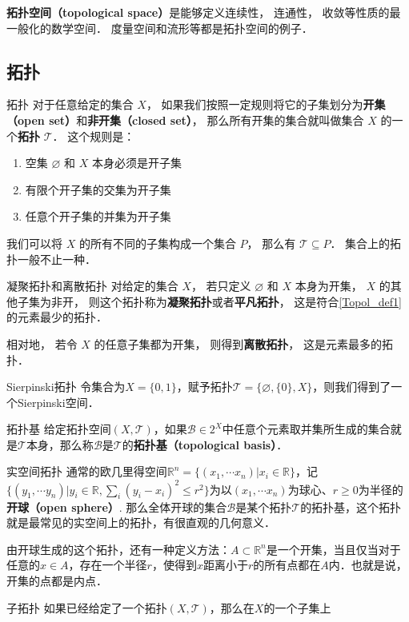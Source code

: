 

\textbf{拓扑空间（topological space）}是能够定义连续性， 连通性， 收敛等性质的最一般化的数学空间． 度量空间和流形等都是拓扑空间的例子．

\subsection{拓扑}

\begin{definition}{拓扑}\label{Topol_def1}
对于任意给定的集合 $X$， 如果我们按照一定规则将它的子集划分为\textbf{开集（open set）}和\textbf{非开集（closed set）}， 那么所有开集的集合就叫做集合 $X$ 的一个\textbf{拓扑} $\mathcal{T}$． 这个规则是：
\begin{enumerate}
\item 空集 $\varnothing$ 和 $X$ 本身必须是开子集
\item 有限个开子集的交集为开子集
\item 任意个开子集的并集为开子集
\end{enumerate}
\end{definition}

我们可以将 $X$ 的所有不同的子集构成一个集合 $P$， 那么有 $\mathcal{T} \subseteq P$． 集合上的拓扑一般不止一种．

\begin{example}{凝聚拓扑和离散拓扑}
对给定的集合 $X$， 若只定义 $\varnothing$ 和 $X$ 本身为开集， $X$ 的其他子集为非开， 则这个拓扑称为\textbf{凝聚拓扑}或者\textbf{平凡拓扑}， 这是符合\autoref{Topol_def1} 的元素最少的拓扑．

相对地， 若令 $X$ 的任意子集都为开集， 则得到\textbf{离散拓扑}， 这是元素最多的拓扑．
\end{example}

\begin{example}{Sierpinski拓扑}
令集合为$X=\{0, 1\}$，赋予拓扑$\mathcal{T}=\{\varnothing, \{0\}, X\}$，则我们得到了一个Sierpinski空间．
\end{example}

\begin{definition}{拓扑基}
给定拓扑空间$(X, \mathcal{T})$，如果$\mathcal{B}\in 2^X$中任意个元素取并集所生成的集合就是$\mathcal{T}$本身，那么称$\mathcal{B}$是$\mathcal{T}$的\textbf{拓扑基（topological basis）}．
\end{definition}

\begin{example}{实空间拓扑}
通常的欧几里得空间$\mathbb{R}^n=\{(x_1, \cdots x_n)|x_i\in \mathbb{R}\}$，记$\{(y_1, \cdots y_n)|y_i\in \mathbb{R}, \sum_i(y_i-x_i)^2\leq r^2\}$为以$(x_1, \cdots x_n)$为球心、$r\geqslant 0$为半径的\textbf{开球（open sphere）}. 那么全体开球的集合$\mathcal{B}$是某个拓扑$\mathcal{T}$的拓扑基，这个拓扑就是最常见的实空间上的拓扑，有很直观的几何意义．

由开球生成的这个拓扑，还有一种定义方法：$A\subset \mathbb{R}^n$是一个开集，当且仅当对于任意的$x\in A$，存在一个半径$r$，使得到$x$距离小于$r$的所有点都在$A$内．也就是说，开集的点都是内点．
\end{example}


\begin{definition}{子拓扑}
如果已经给定了一个拓扑$(X, \mathcal{T})$，那么在$X$的一个子集上
\end{definition}
